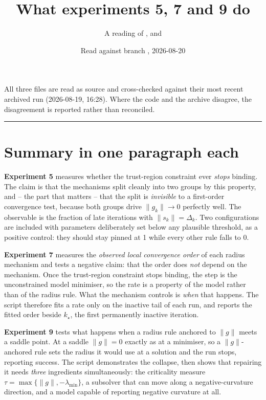 \documentclass[11pt,a4paper]{article}
\title{\vspace{-14mm}\textcolor{NavyAccent}{\textbf{What experiments 5, 7 and 9 do}}}
\author{\normalsize A reading of \file{exp5\_inactivity.jl},
        \file{exp7\_convergence\_rate.jl} and \file{exp9\_second\_order.jl}}
\date{\normalsize Read against branch \file{checking-w-Claude-Code}, 2026-08-20}
\newcommand{\gnorm}{\lVert g\rVert}
\newcommand{\gk}{\lVert g_k\rVert}
\begin{document}
\maketitle
\vspace{-6mm}

\noindent\textcolor{Muted}{\small All three files are read as source and
cross-checked against their most recent archived run (2026-08-19, 16:28). Where
the code and the archive disagree, the disagreement is reported rather than
reconciled.}

\vspace{2mm}
\hrule
\vspace{4mm}

\section*{Summary in one paragraph each}

\textbf{Experiment 5} measures whether the trust-region constraint ever
\emph{stops} binding. The claim is that the mechanisms split cleanly into two
groups by this property, and -- the part that matters -- that the split is
\emph{invisible} to a first-order convergence test, because both groups drive
$\gk \to 0$ perfectly well. The observable is the fraction of late iterations with
$\lVert s_k\rVert = \Delta_k$. Two configurations are included with parameters
deliberately set below any plausible threshold, as a positive control: they should
stay pinned at 1 while every other rule falls to 0.

\smallskip
\textbf{Experiment 7} measures the \emph{observed local convergence order} of each
radius mechanism and tests a negative claim: that the order does \emph{not} depend
on the mechanism. Once the trust-region constraint stops binding, the step is the
unconstrained model minimiser, so the rate is a property of the model rather than
of the radius rule. What the mechanism controls is \emph{when} that happens. The
script therefore fits a rate only on the inactive tail of each run, and reports the
fitted order beside $k_\star$, the first permanently inactive iteration.

\smallskip
\textbf{Experiment 9} tests what happens when a radius rule anchored to $\gnorm$
meets a saddle point. At a saddle $\gnorm = 0$ exactly as at a minimiser, so a
$\gnorm$-anchored rule sets the radius it would use at a solution and the run
stops, reporting success. The script demonstrates the collapse, then shows that
repairing it needs \emph{three} ingredients simultaneously: the criticality measure
$\tau = \max\{\gnorm, -\lambda_{\min}\}$, a subsolver that can move along a
negative-curvature direction, and a model capable of reporting negative curvature
at all.
\end{document}
